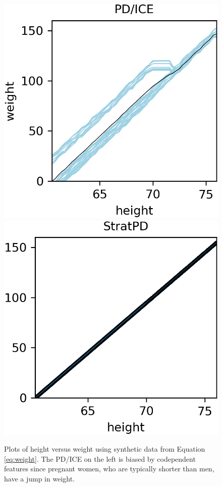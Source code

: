 \documentclass[12pt]{article}
\begin{document}
\begin{figure}[htbp]
\begin{center}
\includegraphics[scale=0.7]{images/height_vs_weight_pdp.png}
\includegraphics[scale=0.7]{images/height_vs_weight_stratpd.png}
\caption{Plots of height versus weight using synthetic data from Equation \eqref{eq:weight}. The PD/ICE on the left is biased by codependent features since pregnant women, who are typically shorter than men, have a jump in weight.}
\label{fig:height_vs_weight}
\end{center}
\end{figure}
\end{document}
